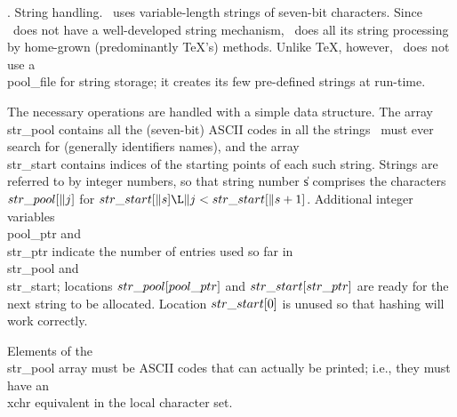 .  String handling.
\BibTeX\ uses variable-length strings of seven-bit characters.
Since \PASCAL\ does not have a well-developed string mechanism,
\BibTeX\ does all its string processing by home-grown
(predominantly \TeX's) methods.
Unlike \TeX, however, \BibTeX\ does not use a \\{pool\_file} for
string storage; it creates its few pre-defined strings at run-time.

The necessary operations are handled with a simple data structure.
The array \\{str\_pool} contains all the (seven-bit) ASCII codes in all
the strings \BibTeX\ must ever search for (generally identifiers
names), and the array \\{str\_start} contains indices of the starting
points of each such string. Strings are referred to by integer
numbers, so that string number \|s comprises the characters
$\\{str\_pool}[\|j]$ for $\\{str\_start}[\|s]\L\|j<\\{str\_start}[\|s+1]$.
Additional integer
variables \\{pool\_ptr} and \\{str\_ptr} indicate the number of entries used
so far in \\{str\_pool} and \\{str\_start}; locations $\\{str\_pool}[\\{pool%
\_ptr}]$
and $\\{str\_start}[\\{str\_ptr}]$ are ready for the next string to be
allocated.  Location $\\{str\_start}[0]$ is unused so that hashing will
work correctly.

Elements of the \\{str\_pool} array must be ASCII codes that can actually be
printed; i.e., they must have an \\{xchr} equivalent in the local
character set.

